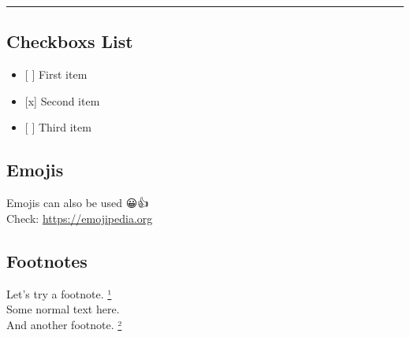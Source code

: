 \documentclass[]{article}
\providecommand{\tightlist}{%
  \setlength{\itemsep}{0pt}\setlength{\parskip}{0pt}}
\begin{document}
\begin{center}\rule{0.5\linewidth}{\linethickness}\end{center}

\subsection{Checkboxs List}\label{checkboxs-list}

\begin{itemize}
\tightlist
\item
  {[} {]} First item
\item
  {[}x{]} Second item
\item
  {[} {]} Third item
\end{itemize}

\subsection{Emojis}\label{emojis}

Emojis can also be used 😀👍\\
Check: \url{https://emojipedia.org}

\subsection{Footnotes}\label{footnotes}

Let's try a footnote. \href{This\%20is\%20a\%20footnote.}{¹}\\
Some normal text here.\\
And another footnote. \href{Second\%20footnote}{²}
\end{document}
